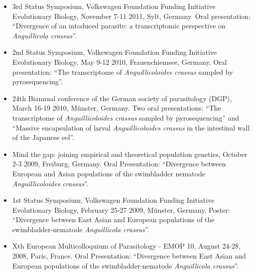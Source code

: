 \begin{itemize}

\item 3rd Status Symposium, Volkswagen Foundation Funding Initiative
  Evolutionary Biology, November 7-11 2011, Sylt, Germany. Oral
  presentation: ``Divergence of an intoduced parasite: a
  transcriptomic perspective on \textit{Anguillicola crassus}''.

\item 2nd Status Symposium, Volkswagen Foundation Funding Initiative
  Evolutionary Biology, May 9-12 2010, Frauenchiemsee, Germany. Oral
  presentation: ``The transcriptome of \textit{Anguillicoloides
    crassus} sampled by pyrosequencing''.

\item 24th Biannual conference of the German society of parasitology
  (DGP), March 16-19 2010, M\"unster, Germany. Two oral presentations:
  ``The transcriptome of \textit{Anguillicoloides crassus} sampled by
  pyrosequencing'' and ``Massive encapsulation of larval
  \textit{Anguillicoloides crassus} in the intestinal wall of the
  Japanese eel''.

\item Mind the gap: joining empirical and theoretical population
  genetics, October 2-3 2009, Freiburg, Germany. Oral Presentation:
  ``Divergence between European and Asian populations of the
  swimbladder nematode \textit{Anguillicoloides crassus}''.

\item 1st Status Symposium, Volkswagen Foundation Funding Initiative
  Evolutionary Biology, February 25-27 2009, M\"unster,
  Germany. Poster: ``Divergence between East Asian and European
  populations of the swimbladder-nematode \textit{Anguillicola
    crassus}''.

\item Xth European Multicolloquium of Parasitology - EMOP 10, August
  24-28, 2008, Paris, France. Oral Presentation: ``Divergence between
  East Asian and European populations of the swimbladder-nematode
  \textit{Anguillicola crassus}''.

\end{itemize}



